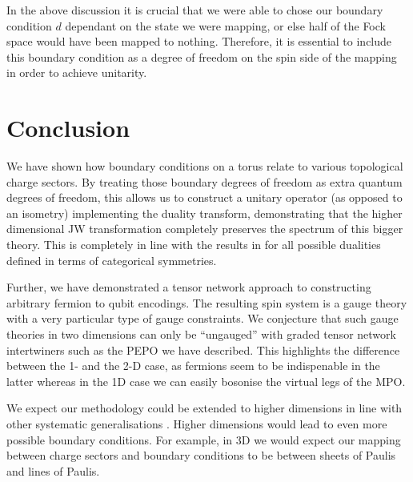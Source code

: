 In the above discussion it is crucial that we were able to chose our boundary condition $d$ dependant on the state we were mapping, or else half of the Fock space would have been mapped to nothing. Therefore, it is essential to include this boundary condition as a degree of freedom on the spin side of the mapping in order to achieve unitarity. 

\section{Conclusion}
We have shown how boundary conditions on a torus relate to various topological charge sectors. By treating those boundary degrees of freedom as extra quantum degrees of freedom, this allows us to construct a unitary operator (as opposed to an isometry) 
implementing the duality transform, demonstrating that the higher dimensional JW transformation completely preserves the spectrum of this bigger theory. This is completely in line with the results in \cite{lootens2023lowdepth, Lootens_2023, Lootens:2022avn} for all possible dualities defined in terms of categorical symmetries. 

Further, we have demonstrated a tensor network approach to constructing arbitrary fermion to qubit encodings. The resulting spin system is a gauge theory with a very particular type of gauge constraints. We conjecture that such gauge theories in two dimensions can only be ``ungauged''  with graded tensor network intertwiners such as the PEPO we have described. This highlights the difference between the 1- and the 2-D case, as fermions seem to be indispenable in the latter whereas in the 1D case we can easily bosonise the virtual legs of the MPO. 

We expect our methodology could be extended to higher dimensions in line with other systematic generalisations \cite{threeboson, arbboson}. Higher dimensions would lead to even more possible boundary conditions. For example, in 3D we would expect our mapping between charge sectors and boundary conditions to be between sheets of Paulis and lines of Paulis. 

